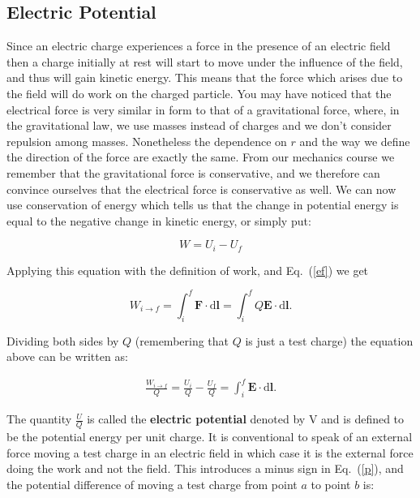 {\subsection{Electric Potential}
Since an electric charge experiences a force in the presence of an
electric field then a charge initially at rest will start to move
under the influence of the field, and thus will gain kinetic
energy.  This means that the force which arises due to the field
will do work on the charged particle.  You may have noticed that
the electrical force is very similar in form to that of a
gravitational force, where, in the gravitational law, we use masses
instead of charges and we don't consider repulsion among masses.
Nonetheless the dependence on $r$ and the way we define the
direction of the force are exactly the same. From our mechanics
course we remember that the gravitational force is conservative,
and we therefore can convince ourselves that the electrical force
is conservative as well.  We can now use conservation of energy
which tells us that the change in potential energy is equal to the
negative change in kinetic energy, or simply put:

\begin{equation}
W=U_i-U_f
\end{equation}

Applying this equation with the definition of work, and
Eq.~(\ref{ef}) we get

\begin{equation}
W_{i\rightarrow f}=\int^f_i
{\mathbf{F}}\cdot\mathrm{d}{\mathbf{l}}=\int^f_i
Q{\mathbf{E}}\cdot\mathrm{d}{\mathbf{l}}.\label{pe}
\end{equation}

Dividing both sides by $Q$ (remembering that $Q$ is just a test
charge) the equation above can be written as:

\begin{eqnarray}
\frac{W_{i\rightarrow f}}{Q} =  \frac{U_i}{Q}-\frac{U_f}{Q} =
\int^f_i{\mathbf{E}}\cdot\mathrm{d}{\mathbf{l}}.\label{p}
\end{eqnarray}

The quantity $\frac{U}{Q}$ is called the {\bf{electric potential}}
denoted by V and is defined to be the potential energy per unit
charge. It is conventional to speak of an external force moving a
test charge in an electric field in which case it is the external
force doing the work and not the field.  This introduces a minus
sign in Eq.~(\ref{p}), and the potential difference of moving a
test charge from point $a$ to point $b$ is:

}
